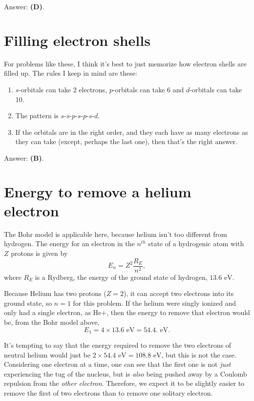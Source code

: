 \documentclass[11pt]{paper}
\newcommand{\answer}[1]{Answer: \textbf{(#1)}.}
\begin{document}
\answer{D}

\section{Filling electron shells}
For problems like these, I think it's best to just memorize how electron shells are filled up.  The rules I keep in mind are these:
\begin{enumerate}
\item $s$-orbitals can take 2 electrons, $p$-orbitals can take 6 and $d$-orbitals can take 10.
\item The pattern is $s$-$s$-$p$-$s$-$p$-$s$-$d$.
\item If the orbitals are in the right order, and they each have as many electrons as they can take (except, perhaps the last one), then that's the right answer.
\end{enumerate}

\answer{B}

\section{Energy to remove a helium electron}
The Bohr model is applicable here, because helium isn't too different from hydrogen.  The energy for an electron in the $n^{th}$ state of a hydrogenic atom with $Z$ protons is given by
\begin{equation}
E_n = Z^2 \frac{R_E}{n^2},
\end{equation}
where $R_E$ is a Rydberg, the energy of the ground state of hydrogen, $13.6\text{ eV}$.

Because Helium has two protons ($Z=2$), it can accept two electrons into its ground state, so $n = 1$ for this problem.  If the helium were singly ionized and only had a single electron, as $\text{He+}$, then the energy to remove that electron would be, from the Bohr model above,
\begin{equation}
E_1 = 4 \times 13.6 \text{ eV} = 54.4.\text{ eV}.
\end{equation}

It's tempting to say that the energy required to remove the two electrons of neutral helium would just be $2 \times 54.4 \text{ eV} = 108.8 \text{ eV}$, but this is not the case.  Considering one electron at a time, one can see that the first one is not \emph{just} experiencing the tug of the nucleus, but is \emph{also} being pushed away by a Coulomb repulsion from the \emph{other electron}.  Therefore, we expect it to be slightly easier to remove the first of two electrons than to remove one solitary electron.
\end{document}
